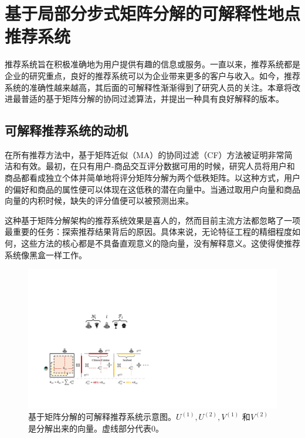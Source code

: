 
\chapter{基于局部分步式矩阵分解的可解释性地点推荐系统}
\label{chapter:main3}

推荐系统旨在积极准确地为用户提供有趣的信息或服务。一直以来，推荐系统都是企业的研究重点，良好的推荐系统可以为企业带来更多的客户与收入。如今，推荐系统的准确性越来越高，其后面的可解释性渐渐得到了研究人员的关注。本章将改进最普适的基于矩阵分解的协同过滤算法，并提出一种具有良好解释的版本。

\section{可解释推荐系统的动机}
在所有推荐方法中，基于矩阵近似（MA）的协同过滤（CF）方法被证明非常简洁和有效。最初，在只有用户-商品交互评分数据可用的时候，研究人员将用户和商品都看成独立个体并简单地将评分矩阵分解为两个低秩矩阵。以这种方式，用户的偏好和商品的属性便可以体现在这低秩的潜在向量中。当通过取用户向量和商品向量的内积时候，缺失的评分值便可以被预测出来。

这种基于矩阵分解架构的推荐系统效果是喜人的，然而目前主流方法都忽略了一项最重要的任务：探索推荐结果背后的原因。具体来说，无论特征工程的精细程度如何，这些方法的核心都是不具备直观意义的隐向量，没有解释意义。这使得使推荐系统像黑盒一样工作。



\begin{figure}[t!]
\includegraphics[width=\textwidth]{pics/explain.pdf}
\caption{基于矩阵分解的可解释推荐系统示意图。$U^{(1)},U^{(2)},V^{(1)}$ 和$V^{(2)}$ 是分解出来的向量。虚线部分代表0。} 
\label{explain}
\end{figure}

